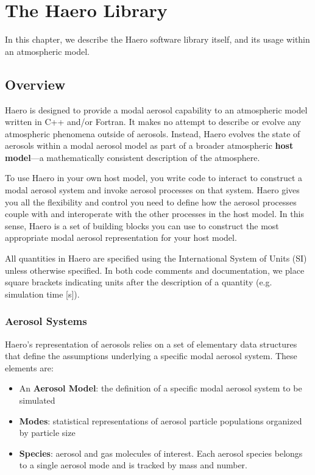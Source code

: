 \chapter{The Haero Library}

In this chapter, we describe the Haero software library itself, and its usage
within an atmospheric model.

\section{Overview}

Haero is designed to provide a modal aerosol capability to an atmospheric model
written in C++ and/or Fortran. It makes no attempt to describe or evolve any
atmospheric phenomena outside of aerosols. Instead, Haero evolves the state of
aerosols within a modal aerosol model as part of a broader atmospheric
{\bf host model}---a mathematically consistent description of the atmosphere.

To use Haero in your own host model, you write code to interact to construct
a modal aerosol system and invoke aerosol processes on that system. Haero gives
you all the flexibility and control you need to define how the aerosol processes
couple with and interoperate with the other processes in the host model. In this
sense, Haero is a set of building blocks you can use to construct the most
appropriate modal aerosol representation for your host model.

All quantities in Haero are specified using the International System of Units
(SI) unless otherwise specified. In both code comments and documentation, we
place square brackets indicating units after the description of a quantity
(e.g. simulation time [s]).

\subsection{Aerosol Systems}

Haero's representation of aerosols relies on a set of elementary data structures
that define the assumptions underlying a specific modal aerosol system. These
elements are:

\begin{itemize}
  \item An {\bf Aerosol Model}: the definition of a specific modal aerosol
        system to be simulated
  \item {\bf Modes}: statistical representations of aerosol particle populations
        organized by particle size
  \item {\bf Species}: aerosol and gas molecules of interest. Each aerosol
        species belongs to a single aerosol mode and is tracked by mass and
        number.
\end{itemize}

